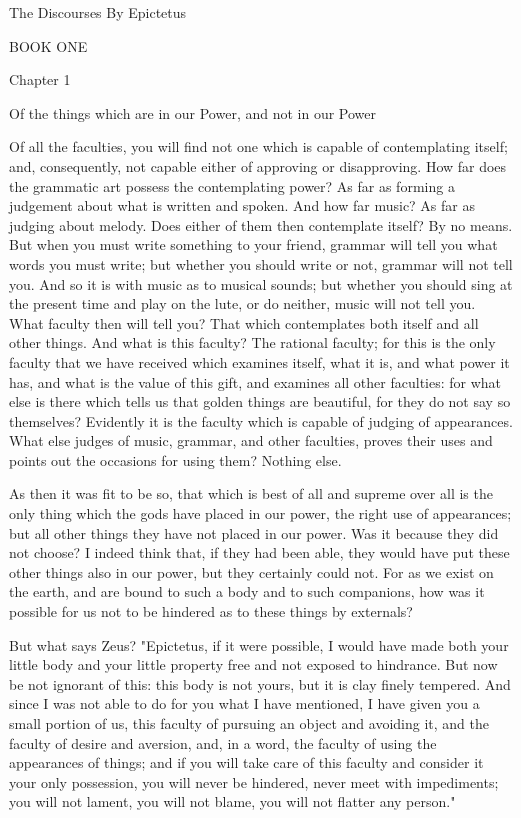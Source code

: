 \documentclass[a4paper]{article}
\begin{document}
The Discourses
By Epictetus

BOOK ONE

Chapter 1 

Of the things which are in our Power, and not in our Power

Of all the faculties, you will find not one which is capable of contemplating
itself; and, consequently, not capable either of approving or disapproving.
How far does the grammatic art possess the contemplating power? As
far as forming a judgement about what is written and spoken. And how
far music? As far as judging about melody. Does either of them then
contemplate itself? By no means. But when you must write something
to your friend, grammar will tell you what words you must write; but
whether you should write or not, grammar will not tell you. And so
it is with music as to musical sounds; but whether you should sing
at the present time and play on the lute, or do neither, music will
not tell you. What faculty then will tell you? That which contemplates
both itself and all other things. And what is this faculty? The rational
faculty; for this is the only faculty that we have received which
examines itself, what it is, and what power it has, and what is the
value of this gift, and examines all other faculties: for what else
is there which tells us that golden things are beautiful, for they
do not say so themselves? Evidently it is the faculty which is capable
of judging of appearances. What else judges of music, grammar, and
other faculties, proves their uses and points out the occasions for
using them? Nothing else. 

As then it was fit to be so, that which is best of all and supreme
over all is the only thing which the gods have placed in our power,
the right use of appearances; but all other things they have not placed
in our power. Was it because they did not choose? I indeed think that,
if they had been able, they would have put these other things also
in our power, but they certainly could not. For as we exist on the
earth, and are bound to such a body and to such companions, how was
it possible for us not to be hindered as to these things by externals?

But what says Zeus? "Epictetus, if it were possible, I would have
made both your little body and your little property free and not exposed
to hindrance. But now be not ignorant of this: this body is not yours,
but it is clay finely tempered. And since I was not able to do for
you what I have mentioned, I have given you a small portion of us,
this faculty of pursuing an object and avoiding it, and the faculty
of desire and aversion, and, in a word, the faculty of using the appearances
of things; and if you will take care of this faculty and consider
it your only possession, you will never be hindered, never meet with
impediments; you will not lament, you will not blame, you will not
flatter any person." 
\end{document}
